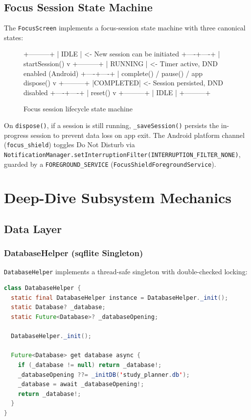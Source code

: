 \documentclass[12pt,a4paper,openany]{report}
\begin{document}
\section{Focus Session State Machine}

The \texttt{FocusScreen} implements a focus-session state machine with three canonical states:

\begin{figure}[H]
\centering
\begin{blockverbatim}
+---------+
|  IDLE   | <- New session can be initiated
+----+----+
     | startSession()
     v
+---------+
| RUNNING | <- Timer active, DND enabled (Android)
+----+----+
     | complete() / pause() / app dispose()
     v
+---------+
|COMPLETED| <- Session persisted, DND disabled
+----+----+
     | reset()
     v
+---------+
|  IDLE   |
+---------+
\end{blockverbatim}
\caption{Focus session lifecycle state machine}
\label{fig:focus-state-machine}
\end{figure}

On \texttt{dispose()}, if a session is still running, \texttt{\_saveSession()} persists the in-progress session to prevent data loss on app exit. The Android platform channel (\texttt{focus\_shield}) toggles Do Not Disturb via \texttt{NotificationManager.setInterruptionFilter(INTERRUPTION\_FILTER\_NONE)}, guarded by a \texttt{FOREGROUND\_SERVICE} (\texttt{FocusShieldForegroundService}).

\chapter{Deep-Dive Subsystem Mechanics}

\section{Data Layer}

\subsection{DatabaseHelper (sqflite Singleton)}

\texttt{DatabaseHelper} implements a thread-safe singleton with double-checked locking:

\begin{lstlisting}[language=Java,caption={DatabaseHelper double-checked locking pattern}]
class DatabaseHelper {
  static final DatabaseHelper instance = DatabaseHelper._init();
  static Database? _database;
  static Future<Database>? _databaseOpening;

  DatabaseHelper._init();

  Future<Database> get database async {
    if (_database != null) return _database!;
    _databaseOpening ??= _initDB('study_planner.db');
    _database = await _databaseOpening!;
    return _database!;
  }
}
\end{lstlisting}
\end{document}

